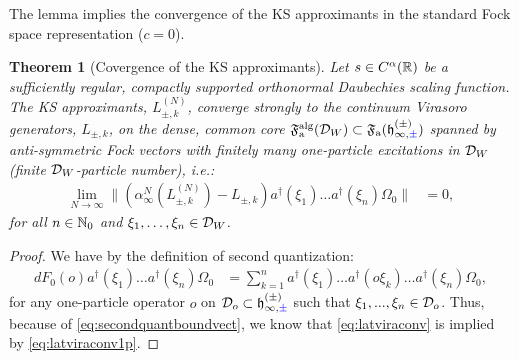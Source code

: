 \documentclass[a4paper, 11pt]{article}
\newcommand{\ua}{\textup a}
\newcommand{\fF}{\mathfrak{F}}\newcommand{\cF}{\mathcal{F}}\newcommand{\dF}{\mathds{F}}\newcommand{\sF}{\mathscr{F}}
\newcommand{\fh}{\mathfrak{h}}
\DeclareMathOperator{\1}{\mathds{1}}
\DeclareMathOperator{\alg}{alg}
\newtheorem{thm}{Theorem} [section]
\begin{document}
The lemma implies the convergence of the KS approximants in the standard Fock space representation ($c=0$).
\begin{thm}[Covergence of the KS approximants]
\label{thm:KSconv}
Let $s\in C^{\alpha}(\mathbb{R})$ be a sufficiently regular, compactly supported orthonormal Daubechies scaling function. The KS approximants, $L^{(N)}_{\pm,k}$, converge strongly to the continuum Virasoro generators, $L_{\pm,k}$, on the dense, common core $\fF^{\alg}_{\ua}(\cD_{W})\subset\fF_{\ua}(\fh^{(\pm)}_{\infty,{\color{blue}\pm}})$ spanned by anti-symmetric Fock vectors with finitely many one-particle excitations in $\mathcal{D}_{W}$ (finite $\mathcal{D}_{W}$-particle number), i.e.:
\begin{align}
\label{eq:latviraconv}
\lim_{N\rightarrow\infty}\|(\alpha^{N}_{\infty}(L^{(N)}_{\pm,k}) - L_{\pm,k})a^{\dagger}(\xi_{1})\dots a^{\dagger}(\xi_{n})\Omega_{0}\| & = 0,
\end{align}
for all $n\in\mathbb{N}_{0}$ and $\xi_{1},\dots,\xi_{n}\in\mathcal{D}_{W}$.
\end{thm}
\begin{proof}
We have by the definition of second quantization:
\begin{align*}
dF_{0}(o)a^{\dagger}(\xi_{1})\dots a^{\dagger}(\xi_{n})\Omega_{0} & = \sum^{n}_{k=1}a^{\dagger}(\xi_{1})\dots a^{\dagger}(o\xi_{k})\dots a^{\dagger}(\xi_{n})\Omega_{0},
\end{align*}
for any one-particle operator $o$ on $\cD_{o}\subset\fh^{(\pm)}_{\infty,{\color{blue}\pm}}$ such that $\xi_{1},...,\xi_{n}\in\mathcal{D}_{o}$. Thus, because of \eqref{eq:secondquantboundvect}, we know that \eqref{eq:latviraconv} is implied by \eqref{eq:latviraconv1p}.
\end{proof}
\end{document}
